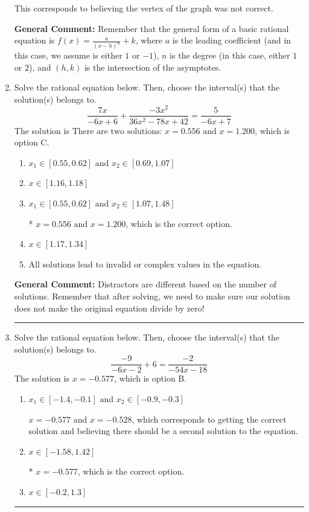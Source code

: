 \documentclass{extbook}[14pt]
\newcommand{\litem}[1]{\item #1

\rule{\textwidth}{0.4pt}}
\begin{document}
\begin{enumerate}
{\begin{enumerate}[label=\Alph*.]
This corresponds to believing the vertex of the graph was not correct.
\end{enumerate}

\textbf{General Comment:} Remember that the general form of a basic rational equation is $ f(x) = \frac{a}{(x-h)^n} + k$, where $a$ is the leading coefficient (and in this case, we assume is either $1$ or $-1$), $n$ is the degree (in this case, either $1$ or $2$), and $(h, k)$ is the intersection of the asymptotes.
}
\litem{
Solve the rational equation below. Then, choose the interval(s) that the solution(s) belongs to.
\[ \frac{7x}{-6x + 6} + \frac{-3x^{2}}{36x^{2} -78 x + 42} = \frac{5}{-6x + 7} \]The solution is \( \text{There are two solutions: } x = 0.556 \text{ and } x = 1.200 \), which is option C.\begin{enumerate}[label=\Alph*.]
\item \( x_1 \in [0.55, 0.62] \text{ and } x_2 \in [0.69,1.07] \)


\item \( x \in [1.16,1.18] \)


\item \( x_1 \in [0.55, 0.62] \text{ and } x_2 \in [1.07,1.48] \)

* $x = 0.556 \text{ and } x = 1.200$, which is the correct option.
\item \( x \in [1.17,1.34] \)


\item \( \text{All solutions lead to invalid or complex values in the equation.} \)


\end{enumerate}

\textbf{General Comment:} Distractors are different based on the number of solutions. Remember that after solving, we need to make sure our solution does not make the original equation divide by zero!
}
\litem{
Solve the rational equation below. Then, choose the interval(s) that the solution(s) belongs to.
\[ \frac{-9}{-6x -2} + 6 = \frac{-2}{-54x -18} \]The solution is \( x = -0.577 \), which is option B.\begin{enumerate}[label=\Alph*.]
\item \( x_1 \in [-1.4, -0.1] \text{ and } x_2 \in [-0.9,-0.3] \)

$x = -0.577 \text{ and } x = -0.528$, which corresponds to getting the correct solution and believing there should be a second solution to the equation.
\item \( x \in [-1.58,1.42] \)

* $x = -0.577$, which is the correct option.
\item \( x \in [-0.2,1.3] \)


\end{enumerate}}
\end{enumerate}
\end{document}
